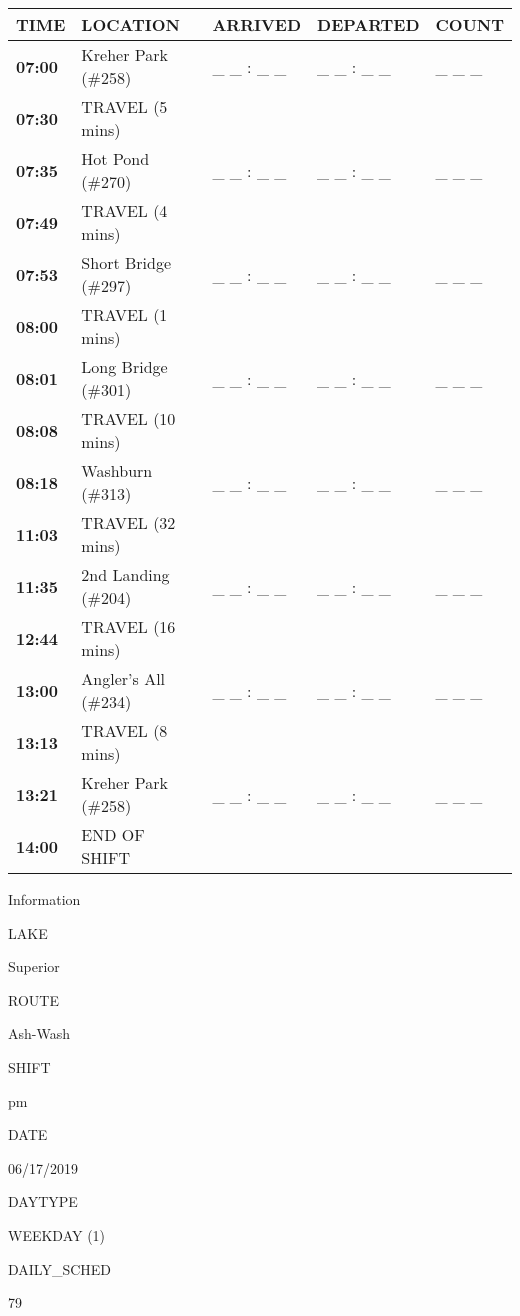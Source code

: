 \documentclass[]{article}
\begin{document}
\begin{tabular}{>{\bfseries}lllll}
\toprule
\textbf{TIME} & \textbf{LOCATION} & \textbf{ARRIVED} & \textbf{DEPARTED} & \textbf{COUNT}\\
\midrule
07:00 & Kreher Park (\#258) & \_ \_ : \_ \_ & \_ \_ : \_ \_ & \_ \_ \_\\
07:30 & TRAVEL (5 mins) &  &  & \\
07:35 & Hot Pond (\#270) & \_ \_ : \_ \_ & \_ \_ : \_ \_ & \_ \_ \_\\
07:49 & TRAVEL (4 mins) &  &  & \\
07:53 & Short Bridge (\#297) & \_ \_ : \_ \_ & \_ \_ : \_ \_ & \_ \_ \_\\
08:00 & TRAVEL (1 mins) &  &  & \\
08:01 & Long Bridge (\#301) & \_ \_ : \_ \_ & \_ \_ : \_ \_ & \_ \_ \_\\
08:08 & TRAVEL (10 mins) &  &  & \\
08:18 & Washburn (\#313) & \_ \_ : \_ \_ & \_ \_ : \_ \_ & \_ \_ \_\\
11:03 & TRAVEL (32 mins) &  &  & \\
11:35 & 2nd Landing (\#204) & \_ \_ : \_ \_ & \_ \_ : \_ \_ & \_ \_ \_\\
12:44 & TRAVEL (16 mins) &  &  & \\
13:00 & Angler's All (\#234) & \_ \_ : \_ \_ & \_ \_ : \_ \_ & \_ \_ \_\\
13:13 & TRAVEL (8 mins) &  &  & \\
13:21 & Kreher Park (\#258) & \_ \_ : \_ \_ & \_ \_ : \_ \_ & \_ \_ \_\\
14:00 & END OF SHIFT &  &  & \\
\bottomrule
\end{tabular}\newpage

Information

LAKE

Superior

ROUTE

Ash-Wash

SHIFT

pm

DATE

06/17/2019

DAYTYPE

WEEKDAY (1)

DAILY\_SCHED

79

\vspace{24pt}
\end{document}
